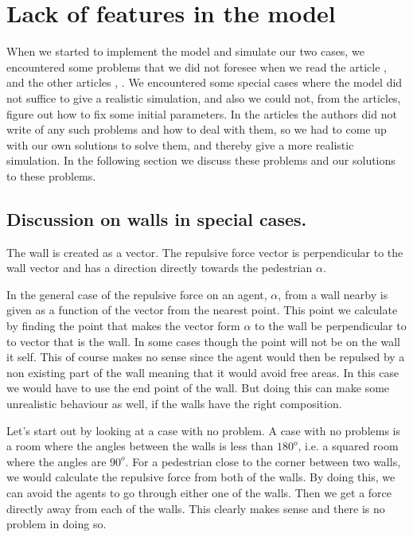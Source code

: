 \section{Lack of features in the model}

\label{sec:lack}
When we started to implement the model and simulate our two cases, we encountered some
problems that we did not foresee when we read the article \cite{self-org}, and the other
articles \cite{helbing00}, \cite{social-force}.
We encountered some special cases where the model did not suffice to give a realistic
simulation, and also we could not, from the articles, figure out how to fix some initial parameters.
In the articles the authors did not write of any such problems and how to deal with them,
so we had to come up with our own solutions to solve them, and thereby give a more realistic
simulation.
In the following section we discuss these problems and our solutions to these problems.

\subsection{Discussion on walls in special cases.}\label{wallEndpoints}
The wall is created as a vector. The repulsive force vector is perpendicular to the wall 
vector and has a direction directly towards the pedestrian $\alpha$.

In the general case of the repulsive force on an agent, $\alpha$, from a wall 
nearby is given as a function of the vector from the nearest point. This point we 
calculate by finding the point that makes the vector form $\alpha$ to the wall be 
perpendicular to to vector that is the wall. In some cases though the point will not 
be on the wall it self. This of course makes no sense since the agent would then be 
repulsed by a non existing part of the wall meaning that it would avoid free 
areas. In this case we would have to use the end point of the wall. But doing this 
can make some unrealistic behaviour as well, if the walls have the right composition. 

Let's start out by looking at a case with no problem. A case with no problems is a 
room where the angles between the walls is less than $180^o$, i.e. a squared room 
where the angles are $90^o$. For a pedestrian close to the corner between two walls, we 
would calculate the repulsive force from both of the walls. By doing this, we can avoid 
the agents to go through either one of the walls. Then we get a force directly away 
from each of the walls. This clearly makes sense and there is no problem in doing so.

